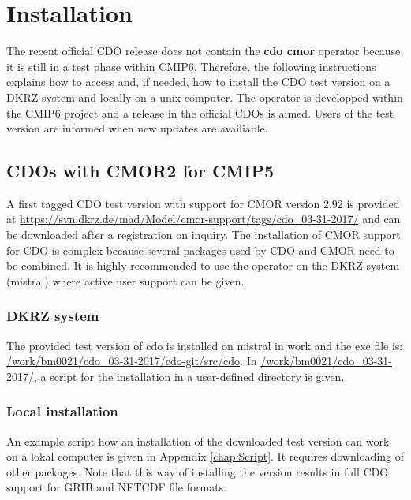 \chapter{Installation}

\vspace{1mm}
\noindent\hspace*{10mm}%

The recent official CDO release does not contain the \textbf{cdo cmor} operator because it is still in a test phase within CMIP6. Therefore, the following instructions explains how to access and, if needed, how to install the CDO test version on a DKRZ system and locally on a unix computer. The operator is developped within the CMIP6 project and a release in the official CDOs is aimed. Users of the test version are informed when new updates are availiable.

\section{CDOs with CMOR2 for CMIP5}

A first tagged CDO test version with support for CMOR version 2.92 is provided at \url{https://svn.dkrz.de/mad/Model/cmor-support/tags/cdo_03-31-2017/} and can be downloaded after a registration on inquiry. The installation of CMOR support for CDO is complex because several packages used by CDO and CMOR need to be combined. It is highly recommended to use the operator on the DKRZ system (mistral) where active user support can be given.

\subsection{DKRZ system}

The provided test version of cdo is installed on mistral in work and the exe file is: \url{/work/bm0021/cdo_03-31-2017/cdo-git/src/cdo}. In \url{/work/bm0021/cdo_03-31-2017/}, a script for the installation in a user-defined directory is given.

\subsection{Local installation}

An example script how an installation of the downloaded test version can work on a lokal computer is given in Appendix \ref{chap:Script}. It requires downloading of other packages. Note that this way of installing the version results in full CDO support for GRIB and NETCDF file formats. 

